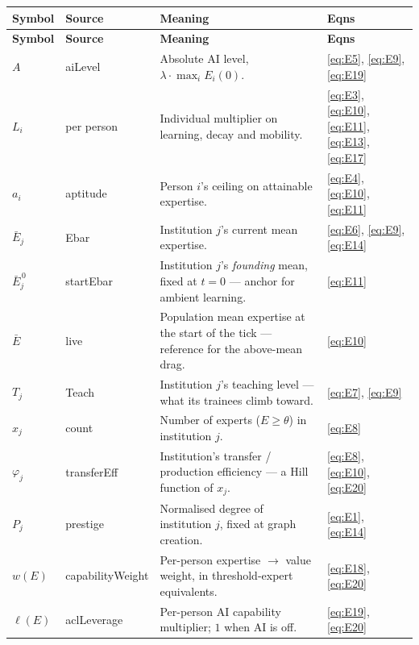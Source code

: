 \documentclass[11pt]{article}
\newcommand{\eqn}[1]{\eqref{eq:#1}}
\begin{document}
\medskip
\noindent\footnotesize
\begin{longtable}{L{1.9cm} K{2.6cm} L{8.4cm} S{2.6cm}}
\toprule
\textbf{Symbol} & \textnormal{\textbf{Source}} & \textbf{Meaning} & \textbf{Eqns} \\
\midrule
\endfirsthead
\toprule
\textbf{Symbol} & \textnormal{\textbf{Source}} & \textbf{Meaning} & \textbf{Eqns} \\
\midrule
\endhead
\bottomrule
\endlastfoot
$A$ & aiLevel & Absolute AI level, $\lambda \cdot \max_i E_i(0)$.
  & \eqn{E5}, \eqn{E9}, \eqn{E19} \\
$L_i$ & \textnormal{per person} & Individual multiplier on learning, decay and
  mobility.
  & \eqn{E3}, \eqn{E10}, \eqn{E11}, \eqn{E13}, \eqn{E17} \\
$a_i$ & aptitude & Person $i$'s ceiling on attainable expertise.
  & \eqn{E4}, \eqn{E10}, \eqn{E11} \\
$\bar E_j$ & Ebar & Institution $j$'s current mean expertise.
  & \eqn{E6}, \eqn{E9}, \eqn{E14} \\
$\bar E_j^{\,0}$ & startEbar & Institution $j$'s \emph{founding} mean, fixed at
  $t = 0$ --- anchor for ambient learning.
  & \eqn{E11} \\
$\bar E$ & \textnormal{live} & Population mean expertise at the start of the tick
  --- reference for the above-mean drag.
  & \eqn{E10} \\
$T_j$ & Teach & Institution $j$'s teaching level --- what its trainees climb
  toward.
  & \eqn{E7}, \eqn{E9} \\
$x_j$ & \textnormal{count} & Number of experts ($E \ge \theta$) in institution
  $j$.
  & \eqn{E8} \\
$\varphi_j$ & transferEff & Institution's transfer / production efficiency --- a
  Hill function of $x_j$.
  & \eqn{E8}, \eqn{E10}, \eqn{E20} \\
$P_j$ & prestige & Normalised degree of institution $j$, fixed at graph creation.
  & \eqn{E1}, \eqn{E14} \\
$w(E)$ & capabilityWeight & Per-person expertise $\rightarrow$ value weight, in
  threshold-expert equivalents.
  & \eqn{E18}, \eqn{E20} \\
$\ell(E)$ & aclLeverage & Per-person AI capability multiplier; $1$ when AI is off.
  & \eqn{E19}, \eqn{E20} \\
\end{longtable}
\end{document}
